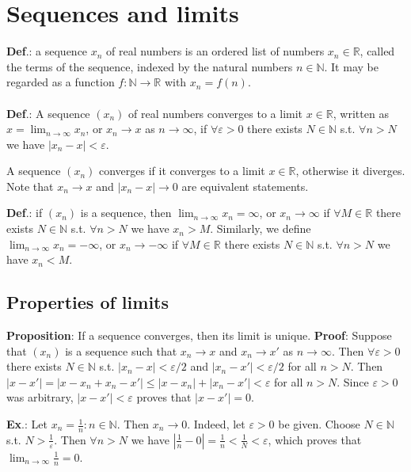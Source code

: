 \documentclass{article}
\begin{document}
\section{Sequences and limits}
\textbf{Def}.: a sequence $x_n$ of real numbers is an ordered list of numbers $x_n \in \mathbb{R}$, called the terms of the sequence, indexed by the natural numbers $n \in \mathbb{N}$. It may be regarded as a function $f: \mathbb{N} \to \mathbb{R}$ with $x_n = f(n)$.
\\
\\
\textbf{Def}.: A sequence $(x_n)$ of real numbers converges to a limit $x \in \mathbb{R}$, written as $\displaystyle x = \lim_{n\to\infty} x_n$, or $x_n \to x$ as $n\to\infty$, if $\forall \varepsilon > 0$ there exists $N \in \mathbb{N}$ s.t. $\forall n > N$ we have $|x_n - x| < \varepsilon$.

A sequence $(x_n)$ converges if it converges to a limit $x \in \mathbb{R}$, otherwise it diverges. Note that $x_n \to x$ and $|x_n - x| \to 0$ are equivalent statements.

\textbf{Def}.: if $(x_n)$ is a sequence, then $\displaystyle \lim_{n\to\infty} x_n = \infty$, or $x_n\to\infty$ if $\forall M \in \mathbb{R}$ there exists $N \in \mathbb{N}$ s.t. $\forall n > N$ we have $x_n > M$. Similarly, we define $\lim_{n\to\infty} x_n = -\infty$, or $x_n \to -\infty$ if $\forall M \in \mathbb{R}$ there exists $N \in \mathbb{N}$ s.t. $\forall n > N$ we have $x_n < M$.

\subsection{Properties of limits}
\textbf{Proposition}: If a sequence converges, then its limit is unique. \textbf{Proof}: Suppose that $(x_n)$ is a sequence such that $x_n \to x$ and $x_n \to x'$ as $n\to\infty$. Then $\forall \varepsilon > 0$ there exists $N \in \mathbb{N}$ s.t. $|x_n - x| < \varepsilon/2$ and $|x_n - x'| < \varepsilon/2$ for all $n > N$. Then $|x - x'| = |x - x_n + x_n - x'| \leq |x - x_n| + |x_n - x'| < \varepsilon$ for all $n > N$. Since $\varepsilon > 0$ was arbitrary, $|x - x'| < \varepsilon$ proves that $|x - x'| = 0$.

\textbf{Ex}.: Let $x_n = \frac{1}{n} : n \in \mathbb{N}$. Then $x_n \to 0$. Indeed, let $\varepsilon > 0$ be given. Choose $N \in \mathbb{N}$ s.t. $N > \frac{1}{\varepsilon}$. Then $\forall n > N$ we have $|\frac{1}{n} - 0| = \frac{1}{n} < \frac{1}{N} < \varepsilon$, which proves that $\displaystyle \lim_{n\to\infty} \frac{1}{n} = 0$.
\end{document}
